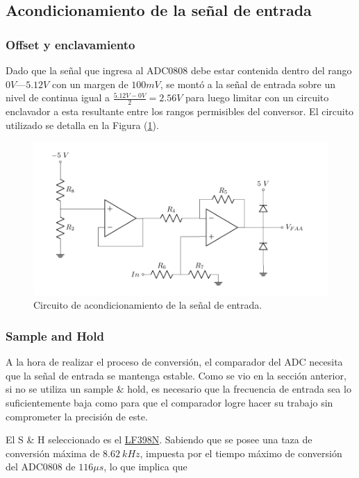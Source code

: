 \subsection{Acondicionamiento de la señal de entrada}

\subsubsection{Offset y enclavamiento}

Dado que la señal que ingresa al ADC0808 debe estar contenida dentro del rango $0V$—$5.12V$ con un margen de $100mV$, se montó a la señal de entrada sobre un nivel de continua igual a $\frac{5.12V - 0V}{2} = 2.56V$ para luego limitar con un circuito enclavador a esta resultante entre los rangos permisibles del conversor. El circuito utilizado se detalla en la Figura (\ref{ACOND}).

\begin{figure}[H]
\centering
\includegraphics[width=0.8\linewidth]{ImagenesEjercicio1/ada.pdf}
\caption{Circuito de acondicionamiento de la señal de entrada.}
\label{ACOND}
\end{figure}

\subsubsection{Sample and Hold}

A la hora de realizar el proceso de conversión, el comparador del ADC necesita que la señal de entrada se mantenga estable. Como se vio en la sección anterior, si no se utiliza un sample $\&$ hold, es necesario que la frecuencia de entrada sea lo suficientemente baja como para que el comparador logre hacer su trabajo sin comprometer la precisión de este.

El S \& H seleccionado es el \href{https://pdf1.alldatasheet.es/datasheet-pdf/view/8580/NSC/LF398N.html}{LF398N}. Sabiendo que se posee una taza de conversión máxima de $8.62 \ kHz$, impuesta por el tiempo máximo de conversión del ADC0808 de $116 \mu s$, lo que implica que

